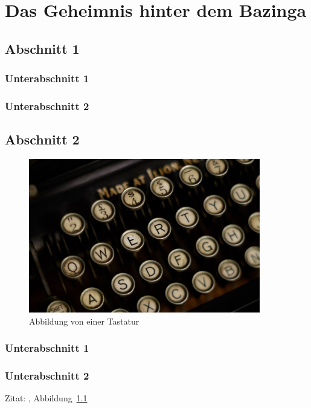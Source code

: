 \chapter{Das Geheimnis hinter dem Bazinga}

\section{Abschnitt 1}

\blindtext

\subsection{Unterabschnitt 1}

\blindtext

\subsection{Unterabschnitt 2}

\blindtext

\section{Abschnitt 2}

\begin{figure}[t]
  \centering
  \includegraphics[width=0.9\textwidth]{Images/Cooper/juriaan-van-der-zwan-1259139-unsplash.jpg}
  \caption{Abbildung von einer Tastatur}
  \label{fig:cooper-tastatur}
\end{figure}

\blindtext

\subsection{Unterabschnitt 1}

\blindtext

\subsection{Unterabschnitt 2}

\blindtext

Zitat: \cite{MKS2009}, Abbildung~\ref{fig:cooper-tastatur}